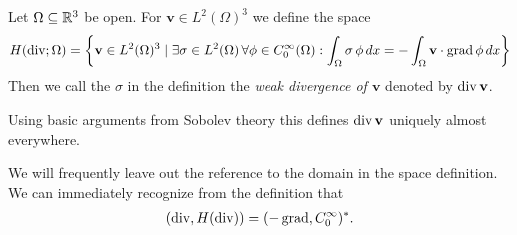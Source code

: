 \documentclass[../master_thesis.tex]{subfiles}
\begin{document}
\begin{definition}
    Let $\Omega \subseteq \mathbb{R}^3$ be open. For $\mathbf{v} \in L^2(\Omega)^3$ we  
    define the space
    \begin{align*}
        H(\operatorname{div};\Omega) = \left\{ \mathbf{v} \in L^2(\Omega)^3 \mid
            \exists \sigma \in L^2(\Omega)\, \forall \phi \in C_0^\infty(\Omega) :  
            \int_\Omega \sigma \, \phi \, dx = -\int_\Omega \mathbf{v} \cdot \operatorname{grad} \phi \, dx \right\}
    \end{align*}
    Then we call the $\sigma$ in the definition the \textit{weak divergence of $\mathbf{v}$}
    denoted by $\operatorname{div} \mathbf{v}$.
\end{definition}
Using basic arguments from Sobolev theory this defines $\operatorname{div} \mathbf{v}$ 
uniquely almost everywhere. 


We will frequently leave out the reference to the domain in the space definition.
We can immediately recognize from the definition that 
\begin{align}
    (\operatorname{div}, H(\operatorname{div})) = (-\operatorname{grad}, C_0^\infty)^*. \label{eq:adjoint_grad_c0inf}
\end{align}
\end{document}
